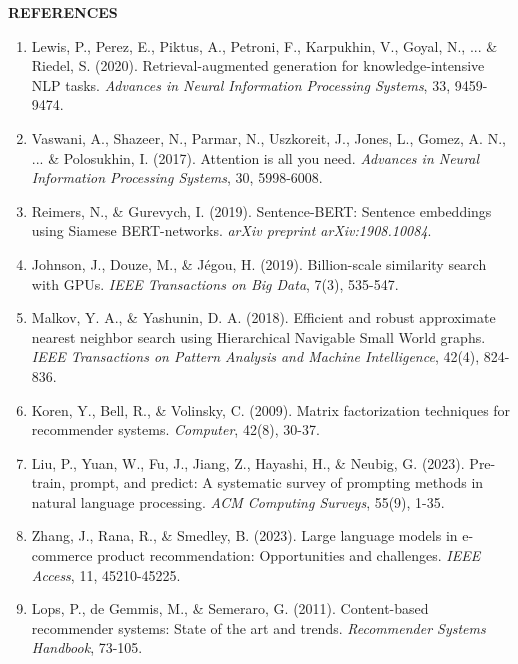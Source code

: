 \documentclass[12pt,a4paper]{article}
\begin{document}
\newpage

\label{sec:ref}
\begin{center}
{\fontsize{16}{20}\bfseries\color{vtuBlue} REFERENCES\\[12pt]}
\end{center}

\begin{enumerate}[leftmargin=2em, itemsep=8pt]
    \item Lewis, P., Perez, E., Piktus, A., Petroni, F., Karpukhin, V., Goyal, N., ... \& Riedel, S. (2020). Retrieval-augmented generation for knowledge-intensive NLP tasks. \textit{Advances in Neural Information Processing Systems}, 33, 9459-9474.
    \item Vaswani, A., Shazeer, N., Parmar, N., Uszkoreit, J., Jones, L., Gomez, A. N., ... \& Polosukhin, I. (2017). Attention is all you need. \textit{Advances in Neural Information Processing Systems}, 30, 5998-6008.
    \item Reimers, N., \& Gurevych, I. (2019). Sentence-BERT: Sentence embeddings using Siamese BERT-networks. \textit{arXiv preprint arXiv:1908.10084}.
    \item Johnson, J., Douze, M., \& Jégou, H. (2019). Billion-scale similarity search with GPUs. \textit{IEEE Transactions on Big Data}, 7(3), 535-547.
    \item Malkov, Y. A., \& Yashunin, D. A. (2018). Efficient and robust approximate nearest neighbor search using Hierarchical Navigable Small World graphs. \textit{IEEE Transactions on Pattern Analysis and Machine Intelligence}, 42(4), 824-836.
    \item Koren, Y., Bell, R., \& Volinsky, C. (2009). Matrix factorization techniques for recommender systems. \textit{Computer}, 42(8), 30-37.
    \item Liu, P., Yuan, W., Fu, J., Jiang, Z., Hayashi, H., \& Neubig, G. (2023). Pre-train, prompt, and predict: A systematic survey of prompting methods in natural language processing. \textit{ACM Computing Surveys}, 55(9), 1-35.
    \item Zhang, J., Rana, R., \& Smedley, B. (2023). Large language models in e-commerce product recommendation: Opportunities and challenges. \textit{IEEE Access}, 11, 45210-45225.
    \item Lops, P., de Gemmis, M., \& Semeraro, G. (2011). Content-based recommender systems: State of the art and trends. \textit{Recommender Systems Handbook}, 73-105.

\end{enumerate}
\end{document}
